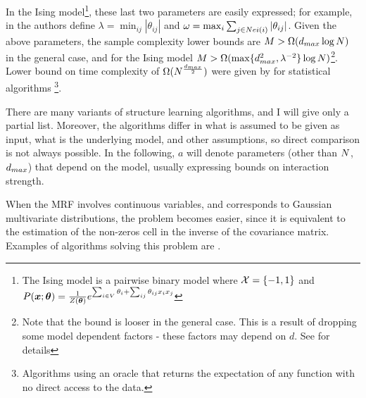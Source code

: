 In the Ising model\footnote{The Ising model is a pairwise binary model where ${\cal X} = \{-1,1\}$ and $P(\boldsymbol{x};\boldsymbol{\theta}) = \frac{1}{Z(\boldsymbol{\theta})} e^{\sum_{i \in V}\theta_i + \sum_{ij}\theta_{ij}x_ix_j}$}, these last two parameters are easily expressed; for example, in \cite{santhanam2012information} the authors define $\lambda =
\min_{ij} |\theta_{ij}|$ and $\omega = \max_i \sum_{j \in Nei(i)} |\theta_{ij}|$.
Given the above parameters, the sample complexity lower bounds are $M > \Omega(d_{max} \log N)$\cite{bresler2008reconstruction} in the general case, and for the Ising model $M > \Omega(\max\{d_{max}^2, \lambda^{-2}\}\log N)$\cite{santhanam2012information}\footnote{Note that the bound is looser in the general case. This is a result of dropping some model dependent factors - these factors may depend on $d$. See \cite{bresler2008reconstruction} for details}.
Lower bound on time complexity of $\Omega(N^{\frac{d_{max}}{2}})$ were given by \cite{bresler2014structure} for statistical algorithms \cite{feldman2013statistical}\footnote{Algorithms using an oracle that returns the expectation of any function with no direct access to the data.}.

There are many variants of structure learning algorithms, and I will give only a partial list. Moreover, the algorithms differ in what is assumed to be given as input, what is the underlying model, and other assumptions, so direct comparison is not always possible. In the following, $a$ will denote parameters (other than $N$, $d_{max}$) that depend on the model, usually expressing bounds on interaction strength.

When the MRF involves continuous variables, and corresponds to Gaussian multivariate distributions, the problem becomes easier, since it is equivalent to the estimation of the non-zeros cell in the inverse of the covariance matrix. Examples of algorithms solving this problem are \cite{meinshausen2006high, yuan2007model, friedman2008sparse}. 

